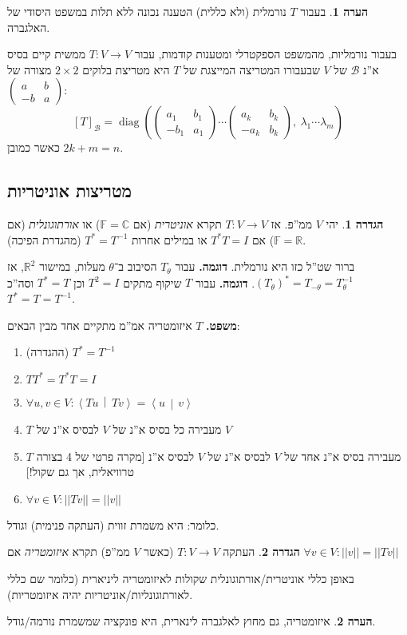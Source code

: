 \documentclass[a4paper]{article}
\newcommand\R     {\mathbb{R}}
\newcommand\C     {\mathbb{C}}
\newcommand\bc    {\mathcal{B}}
\newcommand\ra    {\rangle}
\newcommand\la    {\langle}
\DeclareMathOperator{\diag}    {diag}
\newcommand\F         {\mathbb{F}}
\newcommand\co        {\colon}
\newcommand\pms[1]    {\begin{pmatrix}
		#1
\end{pmatrix}}
\newcommand\norm[1]   {\left \vert \left \vert #1 \right \vert \right \vert}
\newcommand\mut [2]   {\left \la #1 \,\middle|\, #2 \right \ra}
\newcommand\tg        {\theta}
\renewcommand\lg      {\lambda}
\newcommand\op    {^{-1}}
\newcommand\cl [1]    {\left ( #1 \right )}
\theoremstyle{definition}
\newtheorem{Definition}{\color{mygreen}הגדרה}
\newtheorem{Remark}{\color{mycyan}הערה}
\newcommand\defi  [1] {\begin{Definition}#1\end{Definition}}
\newcommand\rmark [1] {\begin{Remark}#1\end{Remark}}
\begin{document}
	\rmark{בעבור $T$ נורמלית (ולא כללית) הטענה נכונה ללא תלות במשפט היסודי של האלגברה. }
	
	בעבור נורמליות, מהמשפט הספקטרלי ומטענות קודמות, עבור $T \co V \to V$ ממשית קיים בסיס א''נ $\bc$ של $V$ שבעבורו המטריצה המייצגת של $T$ היא מטריצת בלוקים $2 \times 2$ מצורה של $\pms{a & b \\ -b & a}$: 
	\[ [T]_\bc = \diag\cl{\pms{a_1 & b_1 \\ -b_1 & a_1} \cdots \pms{a_k & b_k \\ -a_k & b_k}, \ \lg_1 \cdots \lg_m} \]
	כאשר כמובן $2k + m = n$. 
	
	
	
	\subsection{מטריצות אוניטריות}
	\defi{יהי $V$ ממ''פ. אז $T \co V \to V$ תקרא \textit{אוניטרית} (אם $\F = \C$) או \textit{אורתוגונלית} (אם $\F = \R$) אם $T^*T = I$ או במילים אחרות $T^* = T\op$ (מהגדרת הפיכה). }
	ברור שט''ל כזו היא נורמלית. 
	\textbf{דוגמה. }עבור $T_\tg$ הסיבוב ב־$\tg$ מעלות, במישור $\R^2$, אז $(T_\tg)^* = T_{-\tg} = T\op_{\tg}$.  
	\textbf{דוגמה. }עבור $T$ שיקוף מתקים $T^2 = I$ וכן $T^* = T$ וסה''כ $T^* = T = T\op$. 

	\textbf{משפט. }$T$ איזומטריה אמ''מ מתקיים אחד מבין הבאים: 
	\begin{enumerate}
		\item (ההגדרה) \hfil $T^* = T\op$
		\item \hfil $TT^* = T^*T = I$
		\item \hfil $\forall u, v \in V \co \mut{Tu}{Tv} = \mut{u}{v}$
		\item $T$ מעבירה כל בסיס א''נ של $V$ לבסיס א''נ של $V$
		\item $T$ מעבירה בסיס א''נ אחד של $V$ לבסיס א''נ של $V$ לבסיס א''נ [מקרה פרטי של 4 בצורה טרוויאלית, אך גם שקול!]
		\item \hfil $\forall v \in V \co \norm{Tv} = \norm{v}$
	\end{enumerate}
	כלומר: היא משמרת זווית (העתקה פנימית) וגודל. 
	
	
	\defi{העתקה $T \co V \to V$ (כאשר $V$ ממ''פ) תקרא \textit{איזומטריה} אם $\forall v \in V \co \norm{v} = \norm{Tv}$}
	
	באופן כללי אוניטרית/אורתוגונלית שקולות לאיזומטריה ליניארית (כלומר שם כללי לאורתוגונליות/אוניטריות יהיה איזומטריות). 
	
	\rmark{איזומטריה, גם מחוץ לאלגברה לינארית, היא פונקציה שמשמרת נורמה/גודל. }
	
\end{document}
